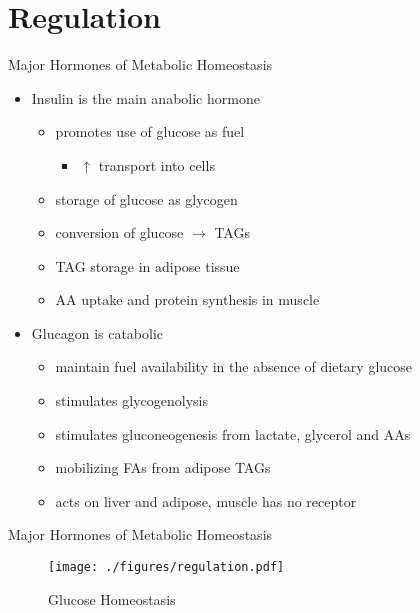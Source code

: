\documentclass[presentation, smaller]{beamer}
\begin{document}
\section{Regulation}
\label{sec:org6f6f883}
\begin{frame}[label={sec:org80dca54}]{Major Hormones of Metabolic Homeostasis}
\begin{itemize}
\item \alert{Insulin} is the main anabolic hormone
\begin{itemize}
\item promotes use of glucose as fuel
\begin{itemize}
\item \(\uparrow\) transport into cells
\end{itemize}
\item storage of glucose as glycogen
\item conversion of glucose \(\to\) TAGs
\item TAG storage in adipose tissue
\item AA uptake and protein synthesis in muscle
\end{itemize}
\item \alert{Glucagon} is catabolic
\begin{itemize}
\item maintain fuel availability in the absence of dietary glucose
\item stimulates glycogenolysis
\item stimulates gluconeogenesis from lactate, glycerol and AAs
\item mobilizing FAs from adipose TAGs
\item acts on liver and adipose, muscle has no receptor
\end{itemize}
\end{itemize}
\end{frame}

\begin{frame}[label={sec:org488ea55}]{Major Hormones of Metabolic Homeostasis}
\begin{figure}[htbp]
\centering
\texttt{[image: ./figures/regulation.pdf]}
\caption{\label{fig:org728259d}
Glucose Homeostasis}
\end{figure}
\end{frame}
\end{document}
